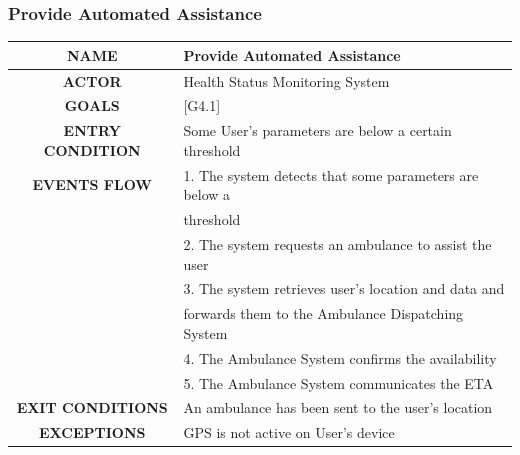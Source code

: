\documentclass[12pt,a4paper]{article}
\begin{document}
		\subsubsection{Provide Automated Assistance}
		\begin{center}
			\begin{tabular}{| c | l |}
				\hline
				\textbf{NAME} & Provide Automated Assistance \\
				\hline
				\textbf{ACTOR} & Health Status Monitoring System \\
				\hline
				\textbf{GOALS} & [G4.1] \\
				\hline
				\textbf{ENTRY CONDITION} & Some User's parameters are below a certain threshold \\ \hline
				\textbf{EVENTS FLOW}  &
				1. The system detects that some parameters are below a \\
				& threshold\\
				&2. The system requests an ambulance to assist the user\\
				&3. The system retrieves user's location and data and\\
				&forwards them to the Ambulance Dispatching System\\
				&4. The Ambulance System confirms the availability\\
				&5. The Ambulance System communicates the ETA\\
				\hline
				\textbf{EXIT CONDITIONS}  & An ambulance has been sent to the user's location \\ \hline
				\textbf{EXCEPTIONS} &
				GPS is not active on User's device\\
				\hline
			\end{tabular}
		\end{center}
	
\end{document}
